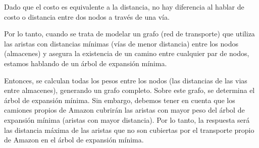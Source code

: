 
Dado que el costo es equivalente a la distancia, no hay diferencia al hablar de costo o distancia entre dos nodos a través de una vía.

Por lo tanto, cuando se trata de modelar un grafo (red de transporte) que utiliza las aristas con distancias mínimas (vías de menor distancia) entre los nodos (almacenes) y asegura la existencia de un camino entre cualquier par de nodos, estamos hablando de un árbol de expansión mínima.

Entonces, se calculan todas los pesos entre los nodos (las distancias de las vias entre almacenes), generando un grafo completo. Sobre este grafo, se determina el árbol de expansión mínima. Sin embargo, debemos tener en cuenta que los camiones propios de Amazon cubrirán las aristas con mayor peso del árbol de expansión mínima (aristas con mayor distancia). Por lo tanto, la respuesta será las distancia máxima de las aristas que no son cubiertas por el transporte propio de Amazon en el árbol de expansión mínima.

